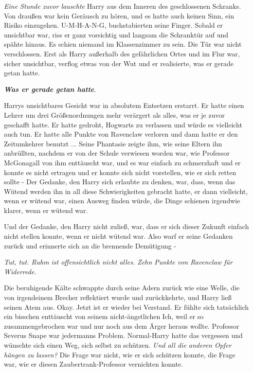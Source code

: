 \emph{Eine Stunde zuvor lauschte} Harry aus dem Inneren des geschlossenen
Schranks. Von draußen war kein Geräusch zu hören, und es hatte auch keinen Sinn,
ein Risiko einzugehen. U-M-H-A-N-G, buchstabierten seine Finger. Sobald er
unsichtbar war, riss er ganz vorsichtig und langsam die Schranktür auf und
spähte hinaus. Es schien niemand im Klassenzimmer zu sein. Die Tür war nicht
verschlossen. Erst als Harry außerhalb des gefährlichen Ortes und im Flur war,
sicher unsichtbar, verflog etwas von der Wut und er realisierte, was er gerade
getan hatte.

\textbf{\emph{Was er gerade getan hatte}}.

Harrys unsichtbares Gesicht war in absolutem Entsetzen erstarrt. Er hatte einen
Lehrer um drei Größenordnungen mehr verärgert als alles, was er je zuvor
geschafft hatte. Er hatte gedroht, Hogwarts zu verlassen und würde es vielleicht
auch tun. Er hatte alle Punkte von Ravenclaw verloren und dann hatte er den
Zeitumkehrer benutzt ... Seine Phantasie zeigte ihm, wie seine Eltern ihn
anbrüllten, nachdem er von der Schule verwiesen worden war, wie Professor
McGonagall von ihm enttäuscht war, und es war einfach zu schmerzhaft und er
konnte es nicht ertragen und er konnte sich nicht vorstellen, wie er sich retten
sollte - Der Gedanke, den Harry sich erlaubte zu denken, war, dass, wenn das
Wütend werden ihn in all diese Schwierigkeiten gebracht hatte, er dann
vielleicht, wenn er wütend war, einen Ausweg finden würde, die Dinge schienen
irgendwie klarer, wenn er wütend war.

Und der Gedanke, den Harry nicht zuließ, war, dass er sich dieser Zukunft
einfach nicht stellen konnte, wenn er nicht wütend war. Also warf er seine
Gedanken zurück und erinnerte sich an die brennende Demütigung -

\emph{Tut, tut. Ruhm ist offensichtlich nicht alles. Zehn Punkte von Ravenclaw
für Widerrede.}

Die beruhigende Kälte schwappte durch seine Adern zurück wie eine Welle, die von
irgendeinem Brecher reflektiert wurde und zurückkehrte, und Harry ließ seinen
Atem aus. Okay. Jetzt ist er wieder bei Verstand. Er fühlte sich tatsächlich ein
bisschen enttäuscht von seinem nicht-ängstlichen Ich, weil er so
zusammengebrochen war und nur noch aus dem Ärger heraus wollte. Professor
Severus Snape war jedermanns Problem. Normal-Harry hatte das vergessen und
wünschte sich einen Weg, sich selbst zu schützen. \emph{Und all die anderen
Opfer hängen zu lassen?} Die Frage war nicht, wie er sich schützen konnte, die
Frage war, wie er diesen Zaubertrank-Professor vernichten konnte.

